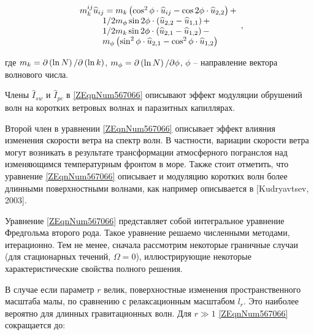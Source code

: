 \begin{equation} \label{1.39)} \begin{array}{l} {m_{k}^{ij} \widehat{u}_{ij} =m_{k} \left(\cos ^{2} \phi \cdot \widehat{u}_{ij} -\cos 2\phi \cdot \widehat{u}_{2,2} \right)+} \\ {\qquad \, \, \, \, {1\mathord{\left/ {\vphantom {1 2}} \right. \kern-\nulldelimiterspace} 2} m_{\phi } \sin 2\phi \cdot \left(\widehat{u}_{2,2} -\widehat{u}_{1,1} \right)+} \\ {\qquad \, \, \, \, {1\mathord{\left/ {\vphantom {1 2}} \right. \kern-\nulldelimiterspace} 2} m_{k} \sin 2\phi \cdot \left(\widehat{u}_{2,1} -\widehat{u}_{1,2} \right)-} \\ {\qquad \, \, \, \, m_{\phi } \left(\sin ^{2} \phi \cdot \widehat{u}_{2,1} -\cos ^{2} \phi \cdot \widehat{u}_{1,2} \right)} \end{array},  \end{equation} 



где $m_{k} ={\partial \left(\ln N\right)\mathord{\left/ {\vphantom {\partial \left(\ln N\right) \partial \left(\ln k\right)}} \right. \kern-\nulldelimiterspace} \partial \left(\ln k\right)} $, $m_{\phi } ={\partial \left(\ln N\right)\mathord{\left/ {\vphantom {\partial \left(\ln N\right) \partial \phi }} \right. \kern-\nulldelimiterspace} \partial \phi } $, $\phi $ -- направление вектора волнового числа.

Члены $\widehat{I}_{sw} $ и $\widehat{I}_{pc} $ в \eqref{ZEqnNum567066} описывают эффект модуляции обрушений волн на коротких ветровых волнах и паразитных капиллярах.

Второй член в уравнении \eqref{ZEqnNum567066} описывает эффект влияния изменения скорости ветра на спектр волн. В частности, вариации скорости ветра могут возникать в результате трансформации атмосферного погранслоя над изменяющимся температурным фронтом в море. Также стоит отметить, что уравнение \eqref{ZEqnNum567066} описывает и модуляцию коротких волн более длинными поверхностными волнами, как например описывается в [Kudryavtsev, 2003].

Уравнение \eqref{ZEqnNum567066} представляет собой интегральное уравнение Фредгольма второго рода. Такое уравнение решаемо численными методами, итерационно. Тем не менее, сначала рассмотрим некоторые граничные случаи (для стационарных течений, $\Omega =0$), иллюстрирующие некоторые характеристические свойства полного решения.

В случае если параметр $r$ велик, поверхностные изменения пространственного масштаба малы, по сравнению с релаксационным масштабом $l_{r} $. Это наиболее вероятно для длинных гравитационных волн. Для $r\gg 1$ \eqref{ZEqnNum567066} сокращается до:



